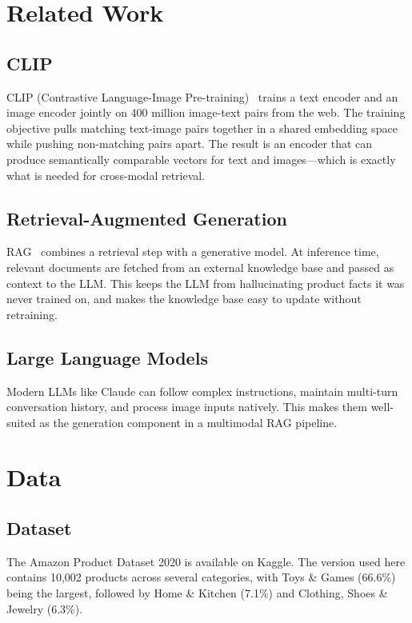\documentclass[11pt]{article}
\begin{document}
\section{Related Work}

\subsection{CLIP}
CLIP (Contrastive Language-Image Pre-training)~\cite{radford2021clip} trains a text encoder
and an image encoder jointly on 400 million image-text pairs from the web. The training
objective pulls matching text-image pairs together in a shared embedding space while pushing
non-matching pairs apart. The result is an encoder that can produce semantically comparable
vectors for text and images---which is exactly what is needed for cross-modal retrieval.

\subsection{Retrieval-Augmented Generation}
RAG~\cite{lewis2020rag} combines a retrieval step with a generative model. At inference time,
relevant documents are fetched from an external knowledge base and passed as context to the LLM.
This keeps the LLM from hallucinating product facts it was never trained on, and makes the
knowledge base easy to update without retraining.

\subsection{Large Language Models}
Modern LLMs like Claude can follow complex instructions, maintain multi-turn conversation history,
and process image inputs natively. This makes them well-suited as the generation component in a
multimodal RAG pipeline.

\section{Data}

\subsection{Dataset}
The Amazon Product Dataset 2020 is available on Kaggle. The version used here contains
10,002 products across several categories, with Toys \& Games (66.6\%) being the largest,
followed by Home \& Kitchen (7.1\%) and Clothing, Shoes \& Jewelry (6.3\%).
\end{document}
